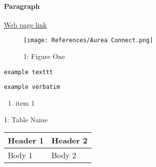 \documentclass[10pt]{article}
\begin{document}
                \paragraph{Paragraph}
                    \href{google.com}{Web page link}
                    \begin{figure}[H]
                        \centerline{\texttt{[image: References/Aurea Connect.png]}}
                        \figurename{ 1: Figure One}
                    \end{figure}
                    \texttt{example texttt}
                    \begin{verbatim}
example verbatim
                    \end{verbatim} 
                    \begin{enumerate}
                        \item item 1
                    \end{enumerate}
                    \begin{table}[H]
                        \centering \tablename{ 1: Table Name} \\
                        \begin{tabularx}{\textwidth}{
                            | >{\raggedright\arraybackslash}X 
                            | >{\centering\arraybackslash}X | }
                            \hline
                            Header 1 & Header 2 \\\hline
                            \hline
                            Body 1 & Body 2 \\\hline
                        \end{tabularx}
                    \end{table}
\end{document}
